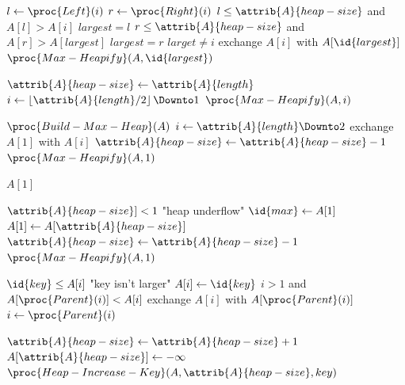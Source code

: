 \documentclass[11pt]{article}
\def\lf{\left\lfloor}
\def\rf{\right\rfloor}
\theoremstyle{definition}
\begin{document}
\begin{codebox}
  \li \(l \gets \proc{Left}(i)\)
  \li \(r \gets \proc{Right}(i)\)
  \li \If \(l \leq \attrib{A}{heap-size}\) and \(A[l] > A[i]\) \Then \li \(largest = l\) \End
  \li \If \(r \leq \attrib{A}{heap-size}\) and \(A[r] > A[largest]\) \Then \li \(largest = r\) \End
  \li \If \(larget \neq i\) \Then 
    \li exchange \(A[i]\) with \(A[\id{largest}]\)
    \li \(\proc{Max-Heapify}(A,\id{largest})\) \End
\end{codebox}

\begin{codebox}
  \li \(\attrib{A}{heap-size} \gets \attrib{A}{length}\)
  \li \For \(i \gets \lf \attrib{A}{length} / 2 \rf \Downto 1\) \Do 
    \li \(\proc{Max-Heapify}(A,i)\) \End
\end{codebox}

\begin{codebox}
  \li \(\proc{Build-Max-Heap}(A)\)
  \li \For \(i \gets \attrib{A}{length} \Downto 2\) \Do 
    \li exchange \(A[1]\) with \(A[i]\)
    \li \(\attrib{A}{heap-size} \gets \attrib{A}{heap-size}-1\)
    \li \(\proc{Max-Heapify}(A,1)\) \End
\end{codebox}

\begin{codebox}
  \li \Return \(A[1]\)
\end{codebox}

\begin{codebox}
  \li \If \(\attrib{A}{heap-size}] < 1\) \Then 
    \li \Error "heap underflow" \End
  \li \(\id{max} \gets A[1]\)
  \li \(A[1] \gets A[\attrib{A}{heap-size}]\)
  \li \(\attrib{A}{heap-size} \gets \attrib{A}{heap-size}-1\)
  \li \(\proc{Max-Heapify}(A,1)\)
  \li \Return {}
\end{codebox}

\begin{codebox}
  \li \If \(\id{key} \leq A[i]\) \Then 
    \li \Error "key isn't larger" \End
  \li \(A[i] \gets \id{key}\)
  \li \While \(i > 1\) and \(A[\proc{Parent}(i)] < A[i]\) \Do 
    \li exchange \(A[i]\) with \(A[\proc{Parent}(i)]\)
    \li \(i \gets \proc{Parent}(i)\) \End
\end{codebox}

\begin{codebox}
  \li \(\attrib{A}{heap-size} \gets \attrib{A}{heap-size} + 1\) 
  \li \(A[\attrib{A}{heap-size}] \gets -\infty\) 
  \li \(\proc{Heap-Increase-Key}(A,\attrib{A}{heap-size},key)\)
\end{codebox}
\newpage
\end{document}

